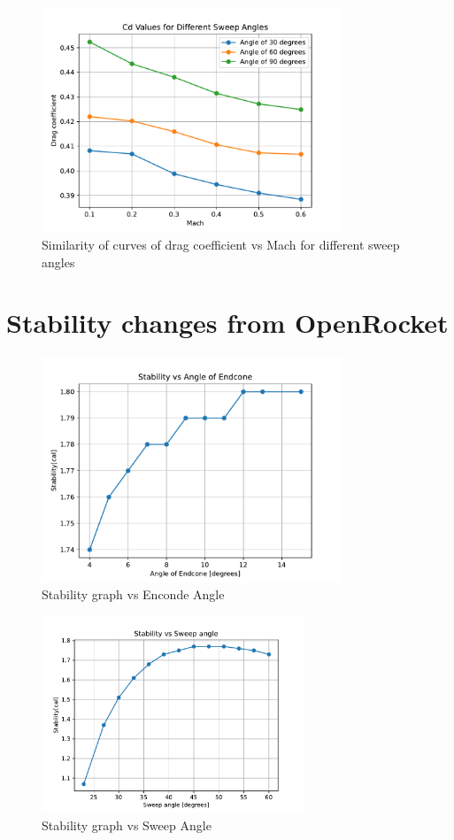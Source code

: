 \documentclass{article}
\begin{document}
\begin{figure}[H]
    \centering
    \includegraphics[width=0.8\textwidth]{../data/R6-Parametric-Fins/CDvsMach.pdf}
    \caption{Similarity of curves of drag coefficient vs Mach for different sweep angles}
\end{figure}

\section{Stability changes from OpenRocket}
\begin{figure}[H]
    \centering
    \includegraphics[width=0.8\textwidth]{../data/OR/EndconeStability.pdf}
    \caption{Stability graph vs Enconde Angle}
\end{figure}
\begin{figure}[H]
    \centering
    \includegraphics[width=0.7\textwidth]{../data/OR/FinStability.pdf}
    \caption{Stability graph vs Sweep Angle}
\end{figure}
\end{document}
